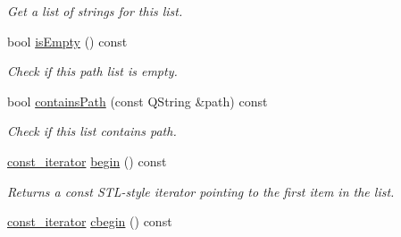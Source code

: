 \begin{DoxyCompactItemize}
\begin{DoxyCompactList}\small\item\em Get a list of strings for this list. \end{DoxyCompactList}\item 
bool \hyperlink{class_mdt_1_1_file_system_1_1_path_list_a4ef93ea25b92cc300e3bf371c676ca2e}{is\+Empty} () const \hypertarget{class_mdt_1_1_file_system_1_1_path_list_a4ef93ea25b92cc300e3bf371c676ca2e}{}\label{class_mdt_1_1_file_system_1_1_path_list_a4ef93ea25b92cc300e3bf371c676ca2e}

\begin{DoxyCompactList}\small\item\em Check if this path list is empty. \end{DoxyCompactList}\item 
bool \hyperlink{class_mdt_1_1_file_system_1_1_path_list_a303d691bfaa3a4d8e066aba909b840f2}{contains\+Path} (const Q\+String \&path) const \hypertarget{class_mdt_1_1_file_system_1_1_path_list_a303d691bfaa3a4d8e066aba909b840f2}{}\label{class_mdt_1_1_file_system_1_1_path_list_a303d691bfaa3a4d8e066aba909b840f2}

\begin{DoxyCompactList}\small\item\em Check if this list contains {\itshape path}. \end{DoxyCompactList}\item 
\hyperlink{class_mdt_1_1_file_system_1_1_path_list_a16481fc90e2859c52398bd361fb69cec}{const\+\_\+iterator} \hyperlink{class_mdt_1_1_file_system_1_1_path_list_ada312296ffa497fa021064b56aee4dac}{begin} () const \hypertarget{class_mdt_1_1_file_system_1_1_path_list_ada312296ffa497fa021064b56aee4dac}{}\label{class_mdt_1_1_file_system_1_1_path_list_ada312296ffa497fa021064b56aee4dac}

\begin{DoxyCompactList}\small\item\em Returns a const S\+T\+L-\/style iterator pointing to the first item in the list. \end{DoxyCompactList}\item 
\hyperlink{class_mdt_1_1_file_system_1_1_path_list_a16481fc90e2859c52398bd361fb69cec}{const\+\_\+iterator} \hyperlink{class_mdt_1_1_file_system_1_1_path_list_a6ece3e61c6f1abc341cf6df8791535dc}{cbegin} () const \hypertarget{class_mdt_1_1_file_system_1_1_path_list_a6ece3e61c6f1abc341cf6df8791535dc}{}\label{class_mdt_1_1_file_system_1_1_path_list_a6ece3e61c6f1abc341cf6df8791535dc}


\end{DoxyCompactItemize}
